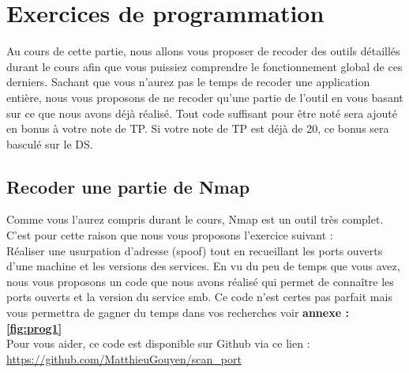\chapter{Exercices de programmation}

Au cours de cette partie, nous allons vous proposer de recoder des outils détaillés durant le cours afin que vous puissiez comprendre le fonctionnement global de ces derniers. Sachant que vous n'aurez pas le temps de recoder une application entière, nous vous proposons de ne recoder qu'une partie de l'outil en vous basant sur ce que nous avons déjà réalisé. Tout code suffisant pour être noté sera ajouté en bonus à votre note de TP. Si votre note de TP est déjà de 20, ce bonus sera basculé sur le DS.

\section{Recoder une partie de Nmap}

Comme vous l'aurez compris durant le cours, Nmap est un outil très complet. C'est pour cette raison que nous vous proposons l'exercice suivant :\\
Réaliser une usurpation d'adresse (spoof) tout en recueillant les ports ouverts d'une machine et les versions des services. En vu du peu de temps que vous avez, nous vous proposons un code que nous avons réalisé qui permet de connaître les ports ouverts et la version du service smb. Ce code n'est certes pas parfait mais vous permettra de gagner du temps dans vos recherches voir \textbf{annexe : \ref{fig:prog1}}\\


\noindent Pour vous aider, ce code est disponible sur Github via ce lien :\\
\url{https://github.com/MatthieuGouyen/scan\_port}


